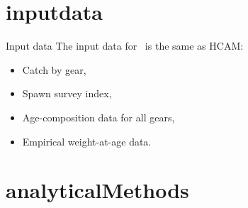 
\section{inputdata} %
\label{sec:inputdata}
%
\begin{frame}{Input data}
	The input data for \iscam\ is the same as HCAM:
	\begin{itemize}
		\item Catch by gear,
		\item Spawn survey index,
		\item Age-composition data for all gears,
		\item Empirical weight-at-age data.
	\end{itemize}
\end{frame}

\section{analyticalMethods} %
\label{sec:analyticalmethods}
%
\begin{frame}
	
\end{frame}
